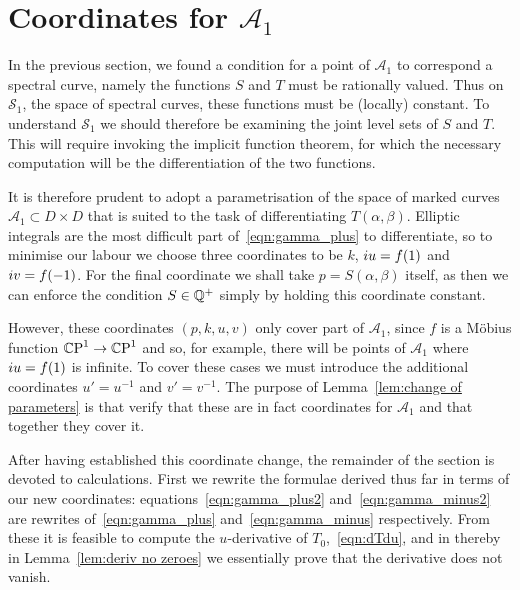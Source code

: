 \section{Coordinates for \texorpdfstring{$\mathcal{A}_1$}{A1}}
\label{sec:Reformulate}

In the previous section, we found a condition for a point of $\mathcal{A}_1$ to correspond a spectral curve, namely the functions $S$ and $T$ must be rationally valued. Thus on $\mathcal{S}_1$, the space of spectral curves, these functions must be (locally) constant. To understand $\mathcal{S}_1$ we should therefore be examining the joint level sets of $S$ and $T$. This will require invoking the implicit function theorem, for which the necessary computation will be the differentiation of the two functions.

It is therefore prudent to adopt a parametrisation of the space of marked curves $\mathcal{A}_1 \subset D\times D$ that is suited to the task of differentiating $T(α,β)$.
Elliptic integrals are the most difficult part of~\eqref{eqn:gamma_plus} to differentiate, so to minimise our labour we choose three coordinates to be $k$, $i u = f(1)$ and $i v = f(-1)$. For the final coordinate we shall take $p=S(α,β)$ itself, as then we can enforce the condition $S\in\Q^+$ simply by holding this coordinate constant.

However, these coordinates $(p,k,u,v)$ only cover part of $\mathcal{A}_1$, since $f$ is a Möbius function $\CP^1 \to \CP^1$ and so, for example, there will be points of $\mathcal{A}_1$ where $i u = f(1)$ is infinite. To cover these cases we must introduce the additional coordinates $u' = u^{-1}$ and $v' = v^{-1}$. The purpose of Lemma~\ref{lem:change of parameters} is that verify that these are in fact coordinates for $\mathcal{A}_1$ and that together they cover it.

After having established this coordinate change, the remainder of the section is devoted to calculations. First we rewrite the formulae derived thus far in terms of our new coordinates: equations~\eqref{eqn:gamma_plus2} and~\eqref{eqn:gamma_minus2} are rewrites of~\eqref{eqn:gamma_plus} and~\eqref{eqn:gamma_minus} respectively. From these it is feasible to compute the $u$-derivative of $T_0$,~\eqref{eqn:dTdu}, and in thereby in Lemma~\ref{lem:deriv no zeroes} we essentially prove that the derivative does not vanish.

